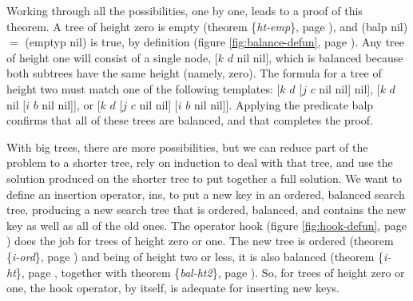Working through all the possibilities, one by one,
leads to a proof of this theorem.
A tree of height zero is empty
(theorem \{\emph{ht-emp}\}, page \pageref{thm:ht-emp}),
and \textsf{(balp nil)} $=$ \textsf{(emptyp nil)} is true, by definition
(figure \ref{fig:balance-defun}, page \pageref{fig:balance-defun}).
Any tree of height one will consist of a single node,
\textsf{[$k$ $d$ nil nil]}, which is balanced because both subtrees
have the same height (namely, zero).
The formula for a tree of height two must match one of the following templates:
\textsf{[$k$ $d$ [$j$ $c$ nil nil] nil]}, \textsf{[$k$ $d$ nil [$i$ $b$ nil nil]]},
or \textsf{[$k$ $d$ [$j$ $c$ nil nil] [$i$ $b$ nil nil]]}.
Applying the predicate \textsf{balp}
confirms that all of these trees are balanced,
and that completes the proof.

With big trees, there are more possibilities,
but we can reduce part of the problem to
a shorter tree, rely on induction to deal with that tree,
and use the solution produced on the shorter tree
to put together a full solution.
We want to define an insertion operator, \textsf{ins},
to put a new key in
an ordered, balanced search tree,
producing a new search tree that is ordered, balanced,
and contains the new key as well as all of the old ones.
The operator \textsf{hook} (figure \ref{fig:hook-defun}, page \pageref{fig:hook-defun})
does the job for trees of height zero or one.
The new tree is ordered (theorem \{\emph{i-ord}\}, page \pageref{thm:i-ord})
and being of height two or less, it is also balanced
(theorem \{\emph{i-ht}\}, page \pageref{thm:i-ht},
together with theorem \{\emph{bal-ht2}\}, page \pageref{thm:bal-ht2}).
So, for trees of height zero or one,
the \textsf{hook} operator, by itself, is adequate for
inserting new keys.

